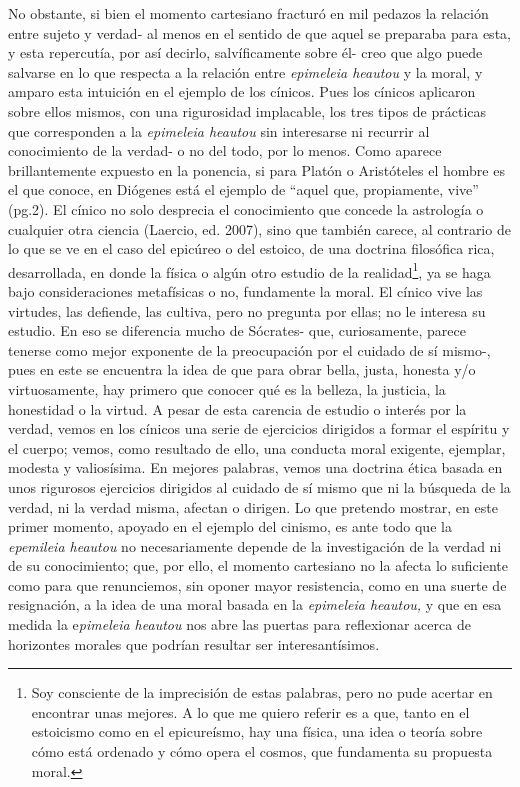 \begin{refsection}
No obstante, si bien el momento cartesiano fracturó en mil pedazos la relación entre sujeto y verdad- al menos en el sentido de que aquel se preparaba para esta, y esta repercutía, por así decirlo, salvíficamente sobre él- creo que algo puede salvarse en lo que respecta a la relación entre \emph{epimeleia heautou} y la moral, y amparo esta intuición en el ejemplo de los cínicos. Pues los cínicos aplicaron sobre ellos mismos, con una rigurosidad implacable, los tres tipos de prácticas que corresponden a la \emph{epimeleia heautou} sin interesarse ni recurrir al conocimiento de la verdad- o no del todo, por lo menos. Como aparece brillantemente expuesto en la ponencia, si para Platón o Aristóteles el hombre es el que conoce, en Diógenes está el ejemplo de ``aquel que, propiamente, vive'' (pg.2). El cínico no solo desprecia el conocimiento que concede la astrología o cualquier otra ciencia (Laercio, ed. 2007), sino que también carece, al contrario de lo que se ve en el caso del epicúreo o del estoico, de una doctrina filosófica rica, desarrollada, en donde la física o algún otro estudio de la realidad\footnote{Soy consciente de la imprecisión de estas palabras, pero no pude acertar en encontrar unas mejores. A lo que me quiero referir es a que, tanto en el estoicismo como en el epicureísmo, hay una física, una idea o teoría sobre cómo está ordenado y cómo opera el cosmos, que fundamenta su propuesta moral.}, ya se haga bajo consideraciones metafísicas o no, fundamente la moral. El cínico vive las virtudes, las defiende, las cultiva, pero no pregunta por ellas; no le interesa su estudio. En eso se diferencia mucho de Sócrates- que, curiosamente, parece tenerse como mejor exponente de la preocupación por el cuidado de sí mismo-, pues en este se encuentra la idea de que para obrar bella, justa, honesta y/o virtuosamente, hay primero que conocer qué es la belleza, la justicia, la honestidad o la virtud. A pesar de esta carencia de estudio o interés por la verdad, vemos en los cínicos una serie de ejercicios dirigidos a formar el espíritu y el cuerpo; vemos, como resultado de ello, una conducta moral exigente, ejemplar, modesta y valiosísima. En mejores palabras, vemos una doctrina ética basada en unos rigurosos ejercicios dirigidos al cuidado de sí mismo que ni la búsqueda de la verdad, ni la verdad misma, afectan o dirigen. Lo que pretendo mostrar, en este primer momento, apoyado en el ejemplo del cinismo, es ante todo que la \emph{epemileia heautou} no necesariamente depende de la investigación de la verdad ni de su conocimiento; que, por ello, el momento cartesiano no la afecta lo suficiente como para que renunciemos, sin oponer mayor resistencia, como en una suerte de resignación, a la idea de una moral basada en la \emph{epimeleia heautou,} y que en esa medida la e\emph{pimeleia heautou} nos abre las puertas para reflexionar acerca de horizontes morales que podrían resultar ser interesantísimos.


\end{refsection}
